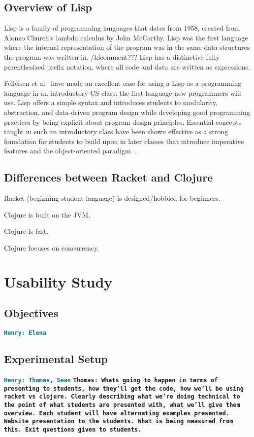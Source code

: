 \documentclass[12pt]{article}
\newcommand{\comment}[1]{{\bf \tt  {#1}}}
\newcommand{\hfcomment}[1]{\textcolor{Teal}{\comment{Henry: {#1}}}}
\newcommand{\thcomment}[1]{\textcolor{Coquelicot}{\comment{Thomas: {#1}}}}
\begin{document}
	\subsection{Overview of Lisp}\label{sec:lisp}
	Lisp is a family of programming languages that dates from 1958, created from Alonzo Church's lambda calculus by John McCarthy. Lisp was the first language where the internal representation of the program was in the same data structures the program was written in. /hfcomment{???} Lisp has a distinctive fully parenthesized prefix notation, where all code and data are written as expressions. 
	
	
	
	Felleisen et al~\cite{Felleisen:2004} have made an excellent case for using a Lisp as a programming language in an introductory CS class:
the first language new programmers will use. Lisp offers a simple
syntax and introduces students to modularity, abstraction, and
data-driven program design while developing good programming
practices by being explicit about program design principles.
Essential concepts taught in such an
introductory class have been shown effective as a
strong foundation for students to
build upon in later classes that introduce imperative features and 
the object-oriented paradigm~\cite{Bieniusa:2008}. 
	\subsection{Differences between Racket and Clojure}\label{sec:diff}

Racket (beginning student language) is designed/hobbled for beginners.

Clojure is built on the JVM.

Clojure is fast.

Clojure focuses on concurrency.
\section{Usability Study}\label{sec:study}
	\subsection{Objectives}\label{sec:obj}
	\hfcomment{Elena}
	\subsection{Experimental Setup}\label{sec:setup}
	\hfcomment{Thomas, Sean}
		\thcomment{Whats going to happen in terms of presenting to students, how they'll get the code, how we'll be using racket vs clojure. Clearly describing what we're doing technical to the point of what students are presented with, what we'll give them overview. Each student will have alternating examples presented. Website presentation to the students. What is being measured from this. Exit questions given to students.}
\end{document}
